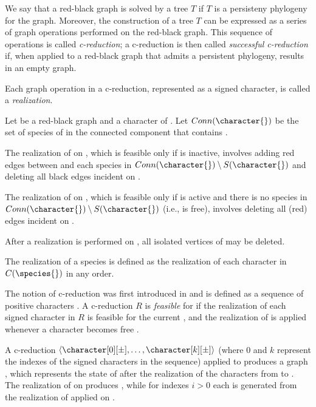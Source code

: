 We say that a red-black graph \grb{} is solved by a tree $T$ if $T$ is a persisteny phylogeny for the graph.
Moreover, the construction of a tree $T$ can be expressed as a series of graph operations performed on the red-black graph.
This sequence of operations is called \emph{c-reduction}; a c-reduction is then called \emph{successful c-reduction} if, when applied to a red-black graph that admits a persistent phylogeny, results in an empty graph.

Each graph operation in a c-reduction, represented as a signed character, is called a \emph{realization}.

\begin{definition}[Realization]\label{definition:realization}
  Let \grb{} be a red-black graph and \character{} a character of \grb{}.
  Let $Conn(\character{})$ be the set of species of \grb{} in the connected component that contains \character{}.

  The realization of \character[][+] on \grb{}, which is feasible only if \character{} is inactive, involves adding red edges between \character{} and each species in $Conn(\character{}) \setminus S(\character{})$ and deleting all black edges incident on \character{}.

  The realization of \character[][-] on \grb{}, which is feasible only if \character{} is active and there is no species in $Conn(\character{}) \setminus S(\character{})$ (i.e., \character{} is free), involves deleting all (red) edges incident on \character{}.

  After a realization is performed on \grb{}, all isolated vertices of \grb{} may be deleted.
\end{definition}

The realization of a species \species{} is defined as the realization of each character in $C(\species{})$ in any order.

The notion of c-reduction was first introduced in \cite{PPPbin2012} and is defined as a sequence of positive characters \character[][+].
A c-reduction $R$ is \emph{feasible} for \grb{} if the realization of each signed character in $R$ is feasible for the current \grb{}, and the realization of \character[i][-] is applied whenever a character \character[i] becomes free \cite{PPPcgraph2016}.

A c-reduction $\langle \character[0][\pm], \dots, \character[k][\pm] \rangle$ (where $0$ and $k$ represent the indexes of the signed characters in the sequence) applied to \grb{} produces a graph \grb[k], which represents the state of \grb{} after the realization of the characters from \character[0][\pm] to \character[k][\pm].
The realization of \character[0][\pm] on \grb{} produces \grb[0], while for indexes $i > 0$ each \grb[i] is generated from the realization of \character[i][\pm] applied on \grb[i-1].

